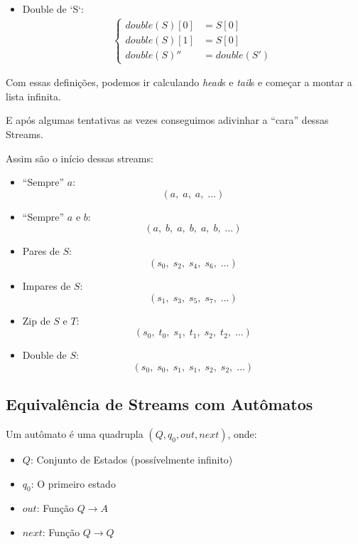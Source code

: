 \documentclass{article}
\newcommand{\head}{\emph{head}}
\newcommand{\tail}{\emph{tail}}
\begin{document}
\begin{multicols}{2}
\begin{itemize}
    \item Double de `S`:
    \begin{align*} \begin{cases}
        double(S)[0] &= S[0] \\
        double(S)[1] &= S[0] \\
        double(S)''  &= double(S')
    \end{cases} \end{align*}
\end{itemize}
\end{multicols}

Com essas definições,
podemos ir calculando \head{}s e \tail{}s
e começar a montar a lista infinita.

E após algumas tentativas as vezes conseguimos
adivinhar a ``cara'' dessas Streams.

Assim são o início dessas streams:
\begin{multicols}{2}
\begin{itemize}
    \item ``Sempre'' \(a\):
    \[
        (a, \; a, \; a, \; \dots)
    \]

    \item ``Sempre'' \(a\) e \(b\):
    \[
        (a, \; b, \; a, \; b, \; a, \; b, \; \dots)
    \]

    \item Pares de \(S\):
    \[
        (s_0, \; s_2, \; s_4, \; s_6, \; \dots)
    \]

    \item Impares de \(S\):
    \[
        (s_1, \; s_3, \; s_5, \; s_7, \; \dots)
    \]

    \item Zip de \(S\) e \(T\):
    \[
        (s_0, \; t_0, \; s_1, \; t_1, \; s_2, \; t_2, \; \dots)
    \]

    \item Double de \(S\):
    \[
        (s_0, \; s_0, \; s_1, \; s_1, \; s_2, \; s_2, \; \dots)
    \]
\end{itemize}
\end{multicols}

\subsection{Equivalência de Streams com Autômatos}

Um autômato é uma quadrupla \((Q, q_0, out, next)\),
onde:
\begin{itemize}
    \item \(Q\): Conjunto de Estados (possívelmente infinito)
    \item \(q_0\): O primeiro estado
    \item \(out\): Função \(Q \to A\)
    \item \(next\): Função \(Q \to Q\)
\end{itemize}
\end{document}
